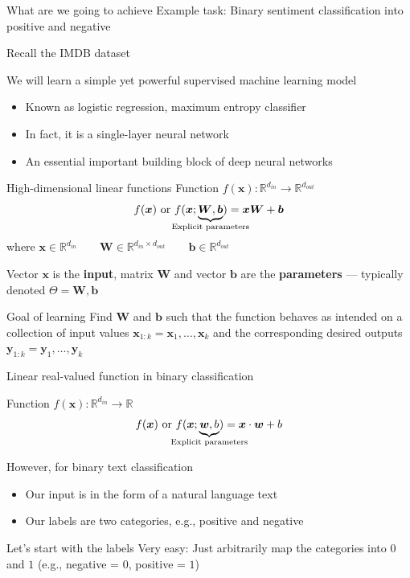 \documentclass[12pt,aspectratio=169,handout]{beamer}
\begin{document}
\begin{frame}{What are we going to achieve}
Example task: Binary sentiment classification into positive and negative

\pause
Recall the IMDB dataset

We will learn a simple yet powerful supervised machine learning model

\begin{itemize}
	\item Known as logistic regression, maximum entropy classifier
	\item In fact, it is a single-layer neural network
	\item An essential important building block of deep neural networks
\end{itemize}


\end{frame}



\begin{frame}{High-dimensional linear functions}
Function $f(\bm{x}) : \mathbb{R}^{d_{in}} \to \mathbb{R}^{d_{out}}$
$$f(\bm{x}) \text{ or }
f(\bm{x}; \underbrace{\bm{W}, \bm{b}}_{\mathclap{\text{Explicit parameters}}})
= \bm{x} \bm{W} + \bm{b}$$
where
$\bm{x} \in \mathbb{R}^{d_{in}} \qquad
\bm{W} \in \mathbb{R}^{d_{in} \times d_{out}} \qquad
\bm{b} \in \mathbb{R}^{d_{out}}$

Vector $\bm{x}$ is the \textbf{input}, matrix $\bm{W}$ and vector $\bm{b}$ are the \textbf{parameters} --- typically denoted $\Theta = \bm{W}, \bm{b}$

\pause
\begin{block}{Goal of learning}
Find $\bm{W}$ and $\bm{b}$ such that
the function behaves as intended on a collection of input values
$\bm{x}_{1:k} = \bm{x}_1, \ldots, \bm{x}_k$ 
and the corresponding desired outputs
$\bm{y}_{1:k} = \bm{y}_1, \ldots, \bm{y}_k$
\end{block}

\end{frame}




\begin{frame}{Linear real-valued function in binary classification}

Function $f(\bm{x}) : \mathbb{R}^{d_{in}} \to \mathbb{R}$
$$f(\bm{x}) \text{ or }
f(\bm{x}; \underbrace{\bm{w}, b}_{\mathclap{\text{Explicit parameters}}})
= \bm{x} \cdot \bm{w} + b$$

However, for binary text classification
\begin{itemize}
	\item Our input is in the form of a natural language text
	\item Our labels are two categories, e.g., positive and negative
\end{itemize}

\pause
\begin{block}{Let's start with the labels}
Very easy: Just arbitrarily map the categories into $0$ and $1$ (e.g., negative = $0$, positive = $1$)
\end{block}

\end{frame}
\end{document}
